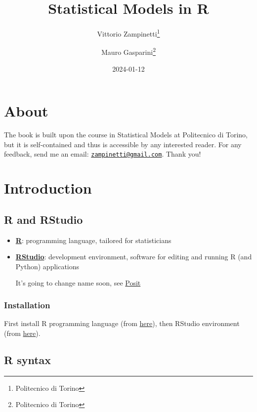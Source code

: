 \documentclass[
  oneside]{book}
\title{Statistical Models in R}
\author{Vittorio Zampinetti\footnote{Politecnico di Torino} \and Mauro Gasparini\footnote{Politecnico di Torino}}
\date{2024-01-12}
\begin{document}
\maketitle

{
\setcounter{tocdepth}{2}
\tableofcontents
}
\hypertarget{about}{%
\chapter*{About}\label{about}}

The book is built upon the course in Statistical Models at
Politecnico di Torino, but it is self-contained and thus is
accessible by any interested reader. For any feedback, send me
an email: \href{mailto:zampinetti@gmail.com}{\nolinkurl{zampinetti@gmail.com}}. Thank you!

\hypertarget{introduction}{%
\chapter{Introduction}\label{introduction}}

\hypertarget{r-and-rstudio}{%
\section{R and RStudio}\label{r-and-rstudio}}

\begin{itemize}
\item
  \href{https://www.r-project.org/}{\textbf{R}}: programming language, tailored for
  statisticians
\item
  \href{https://www.rstudio.com/}{\textbf{RStudio}}: development environment, software for
  editing and running R (and Python) applications

  It's going to change name soon, see \href{https://posit.co/}{Posit}
\end{itemize}

\hypertarget{installation}{%
\subsection{Installation}\label{installation}}

First install R programming language (from \href{https://cran.rstudio.com/}{here}),
then RStudio environment (from
\href{https://www.rstudio.com/products/rstudio/download/\#download}{here}).

\hypertarget{r-syntax}{%
\section{R syntax}\label{r-syntax}}
\end{document}
